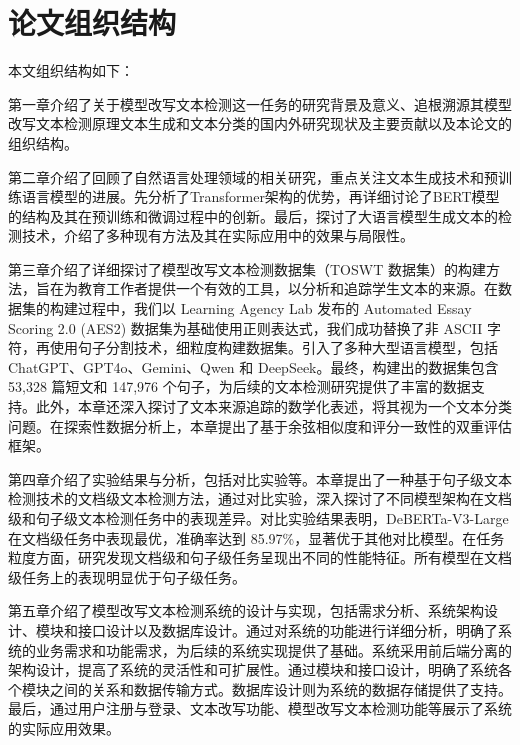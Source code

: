 \section{论文组织结构}
\label{sec:intro-paperarchitect}

本文组织结构如下：

第一章介绍了关于模型改写文本检测这一任务的研究背景及意义、追根溯源其模型改写文本检测原理文本生成和文本分类的国内外研究现状及主要贡献以及本论文的组织结构。

第二章介绍了回顾了自然语言处理领域的相关研究，重点关注文本生成技术和预训练语言模型的进展。先分析了Transformer架构的优势，再详细讨论了BERT模型的结构及其在预训练和微调过程中的创新。最后，探讨了大语言模型生成文本的检测技术，介绍了多种现有方法及其在实际应用中的效果与局限性。

第三章介绍了详细探讨了模型改写文本检测数据集（TOSWT 数据集）的构建方法，旨在为教育工作者提供一个有效的工具，以分析和追踪学生文本的来源。在数据集的构建过程中，我们以 Learning Agency Lab 发布的 Automated Essay Scoring 2.0 (AES2) 数据集为基础使用正则表达式，我们成功替换了非 ASCII 字符，再使用句子分割技术，细粒度构建数据集。引入了多种大型语言模型，包括 ChatGPT、GPT4o、Gemini、Qwen 和 DeepSeek。最终，构建出的数据集包含 53,328 篇短文和 147,976 个句子，为后续的文本检测研究提供了丰富的数据支持。此外，本章还深入探讨了文本来源追踪的数学化表述，将其视为一个文本分类问题。在探索性数据分析上，本章提出了基于余弦相似度和评分一致性的双重评估框架。

第四章介绍了实验结果与分析，包括对比实验等。本章提出了一种基于句子级文本检测技术的文档级文本检测方法，通过对比实验，深入探讨了不同模型架构在文档级和句子级文本检测任务中的表现差异。对比实验结果表明，DeBERTa-V3-Large 在文档级任务中表现最优，准确率达到 85.97\%，显著优于其他对比模型。在任务粒度方面，研究发现文档级和句子级任务呈现出不同的性能特征。所有模型在文档级任务上的表现明显优于句子级任务。

第五章介绍了模型改写文本检测系统的设计与实现，包括需求分析、系统架构设计、模块和接口设计以及数据库设计。通过对系统的功能进行详细分析，明确了系统的业务需求和功能需求，为后续的系统实现提供了基础。系统采用前后端分离的架构设计，提高了系统的灵活性和可扩展性。通过模块和接口设计，明确了系统各个模块之间的关系和数据传输方式。数据库设计则为系统的数据存储提供了支持。最后，通过用户注册与登录、文本改写功能、模型改写文本检测功能等展示了系统的实际应用效果。